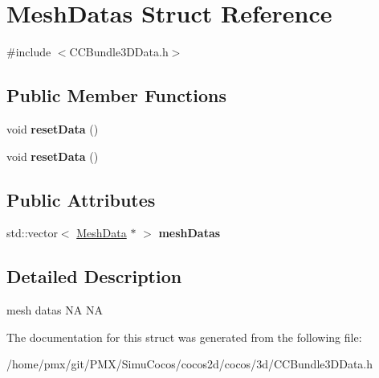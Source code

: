 \hypertarget{structMeshDatas}{}\section{Mesh\+Datas Struct Reference}
\label{structMeshDatas}


{\ttfamily \#include $<$C\+C\+Bundle3\+D\+Data.\+h$>$}

\subsection*{Public Member Functions}
\begin{DoxyCompactItemize}
\item 
\mbox{\label{structMeshDatas_afd57e1d7edb3e9e1be9476703cec6440}} 
void {\bfseries reset\+Data} ()
\item 
\mbox{\label{structMeshDatas_afd57e1d7edb3e9e1be9476703cec6440}} 
void {\bfseries reset\+Data} ()
\end{DoxyCompactItemize}
\subsection*{Public Attributes}
\begin{DoxyCompactItemize}
\item 
\mbox{\label{structMeshDatas_afe76887ff1aab80401df2175400dfd1b}} 
std\+::vector$<$ \hyperlink{structMeshData}{Mesh\+Data} $\ast$ $>$ {\bfseries mesh\+Datas}
\end{DoxyCompactItemize}


\subsection{Detailed Description}
mesh datas  NA  NA 

The documentation for this struct was generated from the following file\+:\begin{DoxyCompactItemize}
\item 
/home/pmx/git/\+P\+M\+X/\+Simu\+Cocos/cocos2d/cocos/3d/C\+C\+Bundle3\+D\+Data.\+h\end{DoxyCompactItemize}
